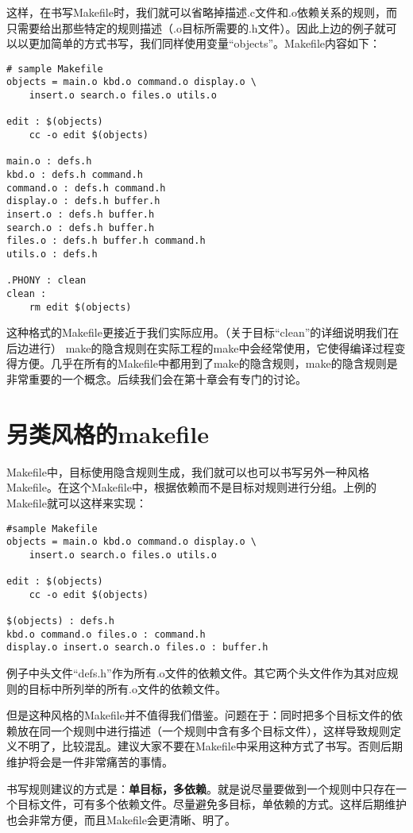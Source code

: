 这样，在书写Makefile时，我们就可以省略掉描述.c文件和.o依赖关系的规则，而只需要给出那些特定的规则描述（.o目标所需要的.h文件）。因此上边的例子就可以以更加简单的方式书写，我们同样使用变量“objects”。Makefile内容如下：


\begin{Verbatim}[]
# sample Makefile
objects = main.o kbd.o command.o display.o \
    insert.o search.o files.o utils.o

edit : $(objects)
    cc -o edit $(objects)

main.o : defs.h
kbd.o : defs.h command.h
command.o : defs.h command.h
display.o : defs.h buffer.h
insert.o : defs.h buffer.h
search.o : defs.h buffer.h
files.o : defs.h buffer.h command.h
utils.o : defs.h

.PHONY : clean
clean :
    rm edit $(objects)
\end{Verbatim}

这种格式的Makefile更接近于我们实际应用。（关于目标“clean”的详细说明我们在后边进行）
make的隐含规则在实际工程的make中会经常使用，它使得编译过程变得方便。几乎在所有的Makefile中都用到了make的隐含规则，make的隐含规则是非常重要的一个概念。后续我们会在第十章会有专门的讨论。


\section{另类风格的makefile}
Makefile中，目标使用隐含规则生成，我们就可以也可以书写另外一种风格Makefile。在这个Makefile中，根据依赖而不是目标对规则进行分组。上例的Makefile就可以这样来实现：

\begin{Verbatim}[]
#sample Makefile
objects = main.o kbd.o command.o display.o \
    insert.o search.o files.o utils.o

edit : $(objects)
    cc -o edit $(objects)

$(objects) : defs.h
kbd.o command.o files.o : command.h
display.o insert.o search.o files.o : buffer.h
\end{Verbatim}

例子中头文件“defs.h”作为所有.o文件的依赖文件。其它两个头文件作为其对应规则的目标中所列举的所有.o文件的依赖文件。

但是这种风格的Makefile并不值得我们借鉴。问题在于：同时把多个目标文件的依赖放在同一个规则中进行描述（一个规则中含有多个目标文件），这样导致规则定义不明了，比较混乱。建议大家不要在Makefile中采用这种方式了书写。否则后期维护将会是一件非常痛苦的事情。

书写规则建议的方式是：\textbf{单目标，多依赖}。就是说尽量要做到一个规则中只存在一个目标文件，可有多个依赖文件。尽量避免多目标，单依赖的方式。这样后期维护也会非常方便，而且Makefile会更清晰、明了。

